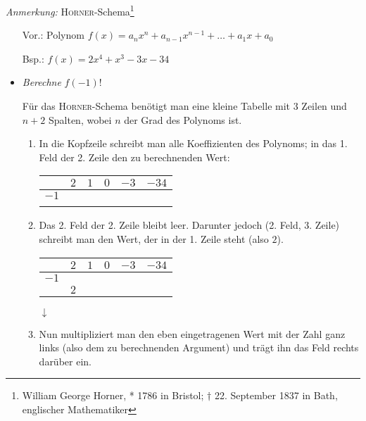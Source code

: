 \textit{Anmerkung:}
\textsc{Horner}-Schema\footnote{William George Horner, * 1786 in Bristol; $\dagger$ 22. September 1837 in Bath, englischer Mathematiker}
\begin{itemize}
    \item[Vor.:] Polynom $f(x) = a_n x^n + a_{n-1} x^{n-1} + \ldots + a_1 x + a_0$
    \item[Bsp.:] $f(x) = 2x^4 + x^3 -3x -34$
\end{itemize}
\begin{itemize}
    \item \textit{Berechne} $f(-1)$!

        Für das \textsc{Horner}-Schema benötigt man eine kleine Tabelle mit 3 Zeilen und $n+2$ Spalten, wobei $n$ der Grad des Polynoms ist.
        \begin{enumerate}
            \item In die Kopfzeile schreibt man alle Koeffizienten des Polynoms; in das 1. Feld der 2. Zeile den zu berechnenden Wert:

                \hspace{3cm}
                    \begin{tabular}{c|ccccc}
                        & $2$   & $1$   & $0$   & $-3$  & $-34$ \\\hline
                        $-1$    &       &       &       &       &       \\\hline
                        \phantom{$-1$}
                    \end{tabular}
            \item Das 2. Feld der 2. Zeile bleibt leer. Darunter jedoch (2. Feld, 3. Zeile) schreibt man den Wert, der in der 1. Zeile steht (also $2$).

                \hspace{3cm}
                    \begin{tabular}{c|ccccc}
                        & $2$   & $1$   & $0$   & $-3$  & $-34$ \\\hline
                        $-1$    &       &       &       &       &       \\\hline
                        & $2$
                    \end{tabular}
                \hspace{2cm}
                $\downarrow$
            \item Nun multipliziert man den eben eingetragenen Wert mit der Zahl ganz links (also dem zu berechnenden Argument) und trägt ihn das Feld rechts darüber ein.


\end{enumerate}
\end{itemize}
